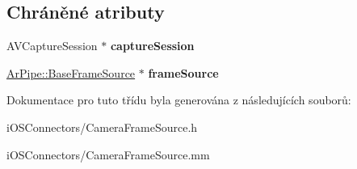 \subsection*{Chráněné atributy}
\begin{DoxyCompactItemize}
\item 
\hypertarget{interface_camera_frame_source_a8eea6afabc799bc7383407b367d03433}{A\-V\-Capture\-Session $\ast$ {\bfseries capture\-Session}}\label{db/dad/interface_camera_frame_source_a8eea6afabc799bc7383407b367d03433}

\item 
\hypertarget{interface_camera_frame_source_a7ee378581e57a4df8ca9d78264adfa06}{\hyperlink{class_ar_pipe_1_1_base_frame_source}{Ar\-Pipe\-::\-Base\-Frame\-Source} $\ast$ {\bfseries frame\-Source}}\label{db/dad/interface_camera_frame_source_a7ee378581e57a4df8ca9d78264adfa06}

\end{DoxyCompactItemize}


Dokumentace pro tuto třídu byla generována z následujících souborů\-:\begin{DoxyCompactItemize}
\item 
i\-O\-S\-Connectors/Camera\-Frame\-Source.\-h\item 
i\-O\-S\-Connectors/Camera\-Frame\-Source.\-mm\end{DoxyCompactItemize}
